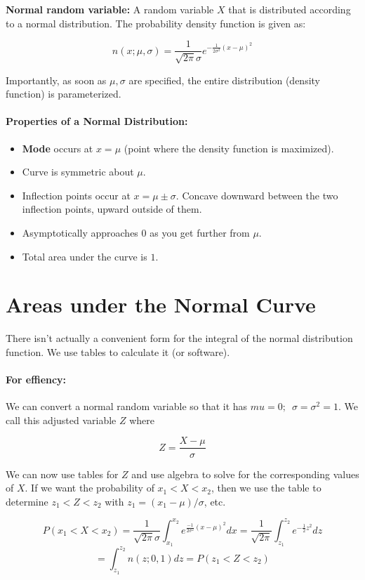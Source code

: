\documentclass[a4paper,12pt]{report}
\begin{document}
\textbf{Normal random variable: } A random variable $X$ that is distributed according to a normal distribution. The probability density function is given as: 

$$n(x; \mu, \sigma) = \frac{1}{\sqrt{2\pi}\sigma} e^{-\frac{1}{2\sigma^2} (x-\mu)^2}$$

Importantly, as soon as $\mu, \sigma$ are specified, the entire distribution (density function) is parameterized.

\paragraph{Properties of a Normal Distribution: } 
\begin{itemize}
\item \textbf{Mode} occurs at $x = \mu$ (point where the density function is maximized).
\item Curve is symmetric about $\mu$.
\item Inflection points occur at $x = \mu \pm \sigma$. Concave downward between the two inflection points, upward outside of them.
\item Asymptotically approaches 0 as you get further from $\mu$.
\item Total area under the curve is $1$.
\end{itemize}

\section{Areas under the Normal Curve}

There isn't actually a convenient form for the integral of the normal distribution function. We use tables to calculate it (or software). 

\paragraph{For effiency: } We can convert a normal random variable so that it has $mu = 0;\,\,\, \sigma = \sigma^2 = 1$. We call this adjusted variable $Z$ where 

$$Z = \frac{X - \mu}{\sigma}$$

We can now use tables for $Z$ and use algebra to solve for the corresponding values of $X$. If we want the probability of $x_1 < X < x_2$, then we use the table to determine $z_1 < Z < z_2$ with $z_1 = (x_1-\mu)/\sigma$, etc. 

$$P(x_1 < X < x_2) = \frac{1}{\sqrt{2\pi}\sigma} \int_{x_1}^{x_2} e^{\frac{-1}{2\sigma^2} (x-\mu)^2} dx = \frac{1}{\sqrt{2\pi}} \int_{z_1}^{z_2} e^{-\frac{1}{2} z^2} dz$$
$$= \int_{z_1}^{z_2} n(z; 0, 1) dz = P(z_1 < Z < z_2)$$
\end{document}
